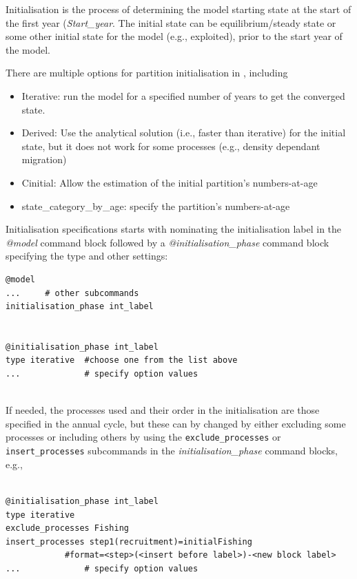 Initialisation is the process of determining the model starting state at the start of the first year (\textit{Start\_year}. The initial state can be equilibrium/steady state or some other initial state for the model (e.g., exploited), prior to the start year of the model. 

There are multiple options for partition initialisation in \CNAME, including

\begin{itemize}
	\item Iterative: run the model for a specified number of years to get the converged state.
	\item Derived: Use the analytical solution (i.e., faster than iterative) for the initial state, but it does not work for some processes (e.g., density dependant migration) 
	\item Cinitial: Allow the estimation of the initial partition's numbers-at-age
	\item state\_category\_by\_age: specify the partition's numbers-at-age 
\end{itemize}

Initialisation specifications starts with nominating the initialisation label in the \textit{@model} command block followed by a \textit{@initialisation\_phase} command block specifying the type and other settings:

{\small{\begin{verbatim}
@model
...     # other subcommands
initialisation_phase int_label


@initialisation_phase int_label
type iterative  #choose one from the list above
...             # specify option values


\end{verbatim}}}

If needed, the processes  used and their order in the initialisation are those specified in the annual cycle, but these can by changed by either excluding some processes or including others by using the  \texttt{exclude\_processes} or  \texttt{insert\_processes} subcommands in the \textit{initialisation\_phase} command blocks, e.g.,
{\small{\begin{verbatim}

@initialisation_phase int_label
type iterative  
exclude_processes Fishing
insert_processes step1(recruitment)=initialFishing 
            #format=<step>(<insert before label>)-<new block label>
...             # specify option values

\end{verbatim}}}

